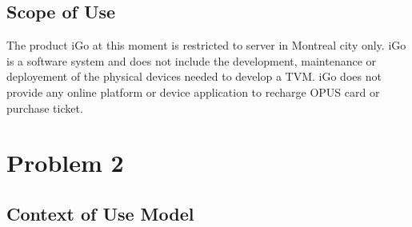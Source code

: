 \documentclass[a4paper,12pt]{report}
\begin{document}
\subsection{Scope of Use}
The product iGo at this moment is restricted to server in Montreal city only. iGo is a software system and does not include the development, maintenance or deployement of the physical devices needed to develop a TVM. iGo does not provide any online platform or device application to recharge OPUS card or purchase ticket.




\section{Problem 2}
\subsection{Context of Use Model}
\end{document}
